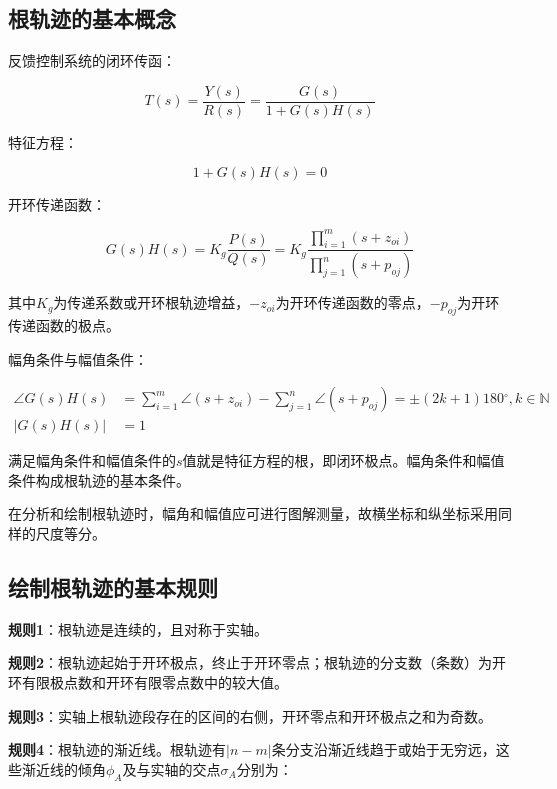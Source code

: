 \documentclass[cn, blue, normal, 12pt]{elegantnote}
\begin{document}
\subsection{根轨迹的基本概念}

反馈控制系统的闭环传函：

\begin{equation}
    T(s)=\frac{Y(s)}{R(s)}=\frac{G(s)}{1+G(s)H(s)}
\end{equation}

特征方程：

\begin{equation}
    1+G(s)H(s)=0
\end{equation}

开环传递函数：

\begin{equation}
    G(s)H(s)=K_g\frac{P(s)}{Q(s)}=K_g\frac{\prod\limits_{i=1}^{m}(s+z_{oi})}{\prod\limits_{j=1}^{n}(s+p_{oj})}
\end{equation}

其中$K_g$为传递系数或开环根轨迹增益，$-z_{oi}$为开环传递函数的零点，$-p_{oj}$为开环传递函数的极点。

幅角条件与幅值条件：

\begin{equation}
    \begin{aligned}
        \angle{G(s)H(s)}&=\sum_{i=1}^{m}\angle{(s+z_{oi})}-\sum_{j=1}^{n}\angle{(s+p_{oj})}=\pm(2k+1)180{^\circ}, k\in\mathbb{N} \\
        |G(s)H(s)|&=1
    \end{aligned}
\end{equation}

满足幅角条件和幅值条件的$s$值就是特征方程的根，即闭环极点。幅角条件和幅值条件构成根轨迹的基本条件。

在分析和绘制根轨迹时，幅角和幅值应可进行图解测量，故横坐标和纵坐标采用同样的尺度等分。

\subsection{绘制根轨迹的基本规则}

\textbf{规则1}：根轨迹是连续的，且对称于实轴。

\textbf{规则2}：根轨迹起始于开环极点，终止于开环零点；根轨迹的分支数（条数）为开环有限极点数和开环有限零点数中的较大值。

\textbf{规则3}：实轴上根轨迹段存在的区间的右侧，开环零点和开环极点之和为奇数。

\textbf{规则4}：根轨迹的渐近线。根轨迹有$|n-m|$条分支沿渐近线趋于或始于无穷远，这些渐近线的倾角$\phi_A$及与实轴的交点$\sigma_A$分别为：
\end{document}
